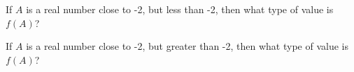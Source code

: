 \documentclass{ximera}
\begin{document}
\begin{exercise}
If $A$ is a real number close to -2, but less than -2, then what type of value is $f(A)$?

\begin{multipleChoice}
\end{multipleChoice}

\end{exercise}




\begin{exercise}
If $A$ is a real number close to -2, but greater than -2, then what type of value is $f(A)$?

\begin{multipleChoice}
\end{multipleChoice}

\end{exercise}
\end{document}
